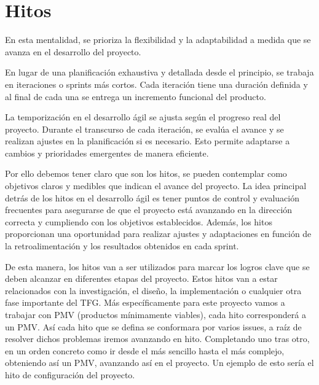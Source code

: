 \section{Hitos}

En esta mentalidad, se prioriza la flexibilidad y la adaptabilidad a medida que se avanza en el desarrollo del proyecto.

En lugar de una planificación exhaustiva y detallada desde el principio, se trabaja en iteraciones o sprints más cortos. Cada iteración tiene una duración definida y al final de cada una se entrega un incremento funcional del producto.

La temporización en el desarrollo ágil se ajusta según el progreso real del proyecto. Durante el transcurso de cada iteración, se evalúa el avance y se realizan ajustes en la planificación si es necesario. Esto permite adaptarse a cambios y prioridades emergentes de manera eficiente.

Por ello debemos tener claro que son los hitos, se pueden contemplar como objetivos claros y medibles que indican el avance del proyecto. La idea principal detrás de los hitos en el desarrollo ágil es tener puntos de control y evaluación frecuentes para asegurarse de que el proyecto está avanzando en la dirección correcta y cumpliendo con los objetivos establecidos. Además, los hitos proporcionan una oportunidad para realizar ajustes y adaptaciones en función de la retroalimentación y los resultados obtenidos en cada sprint. 

De esta manera, los hitos van a ser utilizados para marcar los logros clave que se deben alcanzar en diferentes etapas del proyecto. Estos hitos van a estar relacionados con la investigación, el diseño, la implementación o cualquier otra fase importante del TFG. Más específicamente para este proyecto vamos a trabajar con PMV (productos mínimamente viables), cada hito corresponderá a un PMV. Así cada hito que se defina se conformara por varios issues, a raíz de resolver dichos problemas iremos avanzando en hito. Completando uno tras otro, en un orden concreto como ir desde el más sencillo hasta el más complejo, obteniendo así un PMV, avanzando así en el proyecto. Un ejemplo de esto sería el hito de configuración del proyecto.

